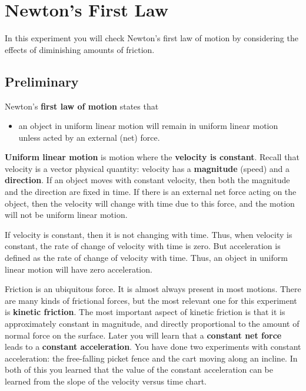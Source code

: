 \setcounter{chapter}{3}
\chapter{Newton's First Law}
In this experiment you will check Newton's first law of motion by considering the effects of diminishing amounts of friction.
\section{Preliminary}
Newton's \textbf{first law of motion} states that
\begin{itemize}
    \item an object in uniform linear motion will remain in uniform linear motion unless acted by an external (net) force.
\end{itemize}
\textbf{Uniform linear motion} is motion where the \textbf{velocity is constant}. Recall that velocity is a vector physical quantity: velocity has a \textbf{magnitude} (speed) and a \textbf{direction}. If an object moves with constant velocity, then both the magnitude and the direction are fixed in time. If there is an external net force acting on the object, then the velocity will change with time due to this force, and the motion will not be uniform linear motion.

If velocity is constant, then it is not changing with time. Thus, when velocity is constant, the rate of change of velocity with time is zero. But acceleration is defined as the rate of change of velocity with time. Thus, an object in uniform linear motion will have zero acceleration.

Friction is an ubiquitous force. It is almost always present in most motions. There are many kinds of frictional forces, but the most relevant one for this experiment is \textbf{kinetic friction}. The most important aspect of kinetic friction is that it is approximately constant in magnitude, and directly proportional to the amount of normal force on the surface. Later you will learn that a \textbf{constant net force} leads to a \textbf{constant acceleration}. You have done two experiments with constant acceleration: the free-falling picket fence and the cart moving along an incline. In both of this you learned that the value of the constant acceleration can be learned from the slope of the velocity versus time chart.
